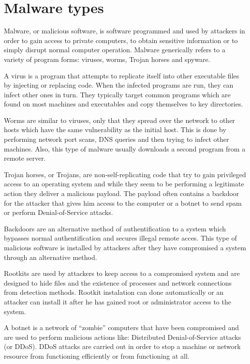 \section{Malware types}
\label{sec:mal-types}

Malware, or malicious software, is software programmed and used by attackers in order to gain access to private computers, to obtain sensitive information or to simply disrupt normal computer operation. Malware generically refers to a variety of program forms: viruses, worms, Trojan horses and spyware.

A virus is a program that attempts to replicate itself into other executable files by injecting or replacing code. When the infected programs are run, they can infect other ones in turn. They typically target common programs which are found on most machines and executables and copy themselves to key directories.

Worms are similar to viruses, only that they spread over the network to other hosts which have the same vulnerability as the initial host. This is done by performing network port scans, DNS queries and then trying to infect other machines. Also, this type of malware usually downloads a second program from a remote server.

Trojan horses, or Trojans, are non-self-replicating code that try to gain privileged access to an operating system and while they seem to be performing a legitimate action they deliver a malicious payload. The payload often contains a backdoor for the attacker that gives him access to the computer or a botnet to send spam or perform Denial-of-Service attacks.

Backdoors are an alternative method of authentification to a system which bypasses normal authentification and secures illegal remote acces. This type of malicious software is installed by attackers after they have compromised a system through an alternative method.

Rootkits are used by attackers to keep access to a compromised system and are designed to hide files and the existence of processes and network connections from detection methods. Rootkit instalation can done automatically or an attacker can install it after he has gained root or administrator access to the system.

A botnet is a network of ``zombie'' computers that have been compromised and are used to perform malicious actions like: Distributed Denial-of-Service attacks (or DDoS). DDoS attacks are carried out in order to stop a machine or network resource from functioning efficiently or from functioning at all.

